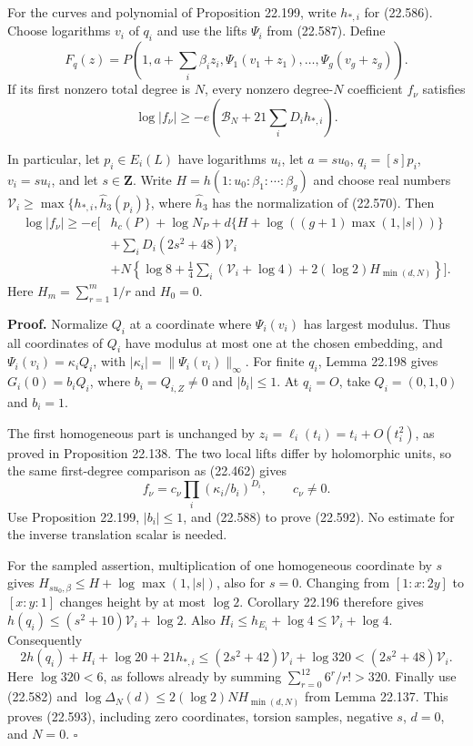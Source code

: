 \documentclass[
  11pt,
  a4paper,
]{article}
\begin{document}
For the curves and polynomial of Proposition 22.199, write \(h_{*,i}\)
for (22.586). Choose logarithms \(v_i\) of \(q_i\) and use the lifts
\(\Psi_i\) from (22.587). Define \[
 F_q(z)=P\left(1,a+\sum_i\beta_i z_i,
                  \Psi_1(v_1+z_1),\ldots,\Psi_g(v_g+z_g)\right).
 \tag{22.591}
\] If its first nonzero total degree is \(N\), every nonzero
degree-\(N\) coefficient \(f_\nu\) satisfies \[
 \log|f_\nu|\ge
 -e\left(\mathcal B_N+21\sum_iD_i h_{*,i}\right).
 \tag{22.592}
\]

In particular, let \(p_i\in E_i(L)\) have logarithms \(u_i\), let
\(a=su_0\), \(q_i=[s]p_i\), \(v_i=su_i\), and let \(s\in\mathbf Z\).
Write \(H=h(1:u_0:\beta_1:\cdots:\beta_g)\) and choose real numbers
\(\mathcal V_i\ge\max\{h_{*,i},\widehat h_3(p_i)\}\), where
\(\widehat h_3\) has the normalization of (22.570). Then \[
\begin{split}
 \log|f_\nu|\ge-e\bigg[&h_c(P)+\log N_P
 +d\{H+\log((g+1)\max(1,|s|))\}\\
 &+\sum_iD_i(2s^2+48)\mathcal V_i\\
 &+N\left\{\log8+\frac14\sum_i(\mathcal V_i+\log4)
                  +2(\log2)H_{\min(d,N)}\right\}\bigg].
\end{split}
\tag{22.593}
\] Here \(H_m=\sum_{r=1}^m1/r\) and \(H_0=0\).

\textbf{Proof.} Normalize \(Q_i\) at a coordinate where \(\Psi_i(v_i)\)
has largest modulus. Thus all coordinates of \(Q_i\) have modulus at
most one at the chosen embedding, and \(\Psi_i(v_i)=\kappa_iQ_i\), with
\(|\kappa_i|=\|\Psi_i(v_i)\|_\infty\). For finite \(q_i\), Lemma 22.198
gives \(G_i(0)=b_iQ_i\), where \(b_i=Q_{i,Z}\ne0\) and \(|b_i|\le1\). At
\(q_i=O\), take \(Q_i=(0,1,0)\) and \(b_i=1\).

The first homogeneous part is unchanged by
\(z_i=\ell_i(t_i)=t_i+O(t_i^2)\), as proved in Proposition 22.138. The
two local lifts differ by holomorphic units, so the same first-degree
comparison as (22.462) gives \[
 f_\nu=c_\nu\prod_i(\kappa_i/b_i)^{D_i},\qquad c_\nu\ne0.
 \tag{22.594}
\] Use Proposition 22.199, \(|b_i|\le1\), and (22.588) to prove
(22.592). No estimate for the inverse translation scalar is needed.

For the sampled assertion, multiplication of one homogeneous coordinate
by \(s\) gives \(H_{su_0,\beta}\le H+\log\max(1,|s|)\), also for
\(s=0\). Changing from \([1:x:2y]\) to \([x:y:1]\) changes height by at
most \(\log2\). Corollary 22.196 therefore gives
\(h(q_i)\le(s^2+10)\mathcal V_i+\log2\). Also
\(H_i\le h_{E_i}+\log4\le\mathcal V_i+\log4\). Consequently \[
 2h(q_i)+H_i+\log20+21h_{*,i}
 \le(2s^2+42)\mathcal V_i+\log320
 <(2s^2+48)\mathcal V_i.
 \tag{22.595}
\] Here \(\log320<6\), as follows already by summing
\(\sum_{r=0}^{12}6^r/r!>320\). Finally use (22.582) and
\(\log\Delta_N(d)\le2(\log2)N H_{\min(d,N)}\) from Lemma 22.137. This
proves (22.593), including zero coordinates, torsion samples, negative
\(s\), \(d=0\), and \(N=0\). \(\square\)
\end{document}
